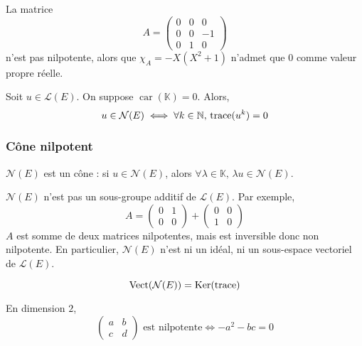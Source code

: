 	\begin{cexample}
		La matrice
		\[
			A = \begin{pmatrix}
				0 & 0 & 0 \\
				0 & 0 & -1 \\
				0 & 1 & 0
			\end{pmatrix}
		\]
		n'est pas nilpotente, alors que $\chi_A = -X(X^2 + 1)$ n'admet que $0$ comme valeur propre réelle.
	\end{cexample}

	\begin{proposition}
		Soit $u \in \mathcal{L}(E)$. On suppose $\operatorname{car}(\mathbb{K}) = 0$. Alors,
		\[ u \in \mathcal{N}(E) \iff \forall k \in \mathbb{N}, \, \operatorname{trace}(u^k) = 0 \]
	\end{proposition}

	\subsubsection{Cône nilpotent}

	\begin{proposition}
		$\mathcal{N}(E)$ est un cône : si $u \in \mathcal{N}(E)$, alors $\forall \lambda \in \mathbb{K}, \, \lambda u \in \mathcal{N}(E)$.
	\end{proposition}

	\begin{remark}
		$\mathcal{N}(E)$ n'est pas un sous-groupe additif de $\mathcal{L}(E)$. Par exemple,
		\[
			A =
			\begin{pmatrix}
				0 & 1 \\
				0 & 0
			\end{pmatrix}
			+
			\begin{pmatrix}
				0 & 0 \\
				1 & 0
			\end{pmatrix}
		\]
		$A$ est somme de deux matrices nilpotentes, mais est inversible donc non nilpotente. En particulier, $\mathcal{N}(E)$ n'est ni un idéal, ni un sous-espace vectoriel de $\mathcal{L}(E)$.
	\end{remark}

	\begin{proposition}
		\[ \operatorname{Vect}(\mathcal{N}(E)) = \mathrm{Ker}(\operatorname{trace}) \]
	\end{proposition}

	\begin{example}
		En dimension $2$,
		\[
			\begin{pmatrix}
				a & b \\
				c & d
			\end{pmatrix}
			\text{ est nilpotente}
			\iff
			-a^2 -bc = 0
		\]
	\end{example}

